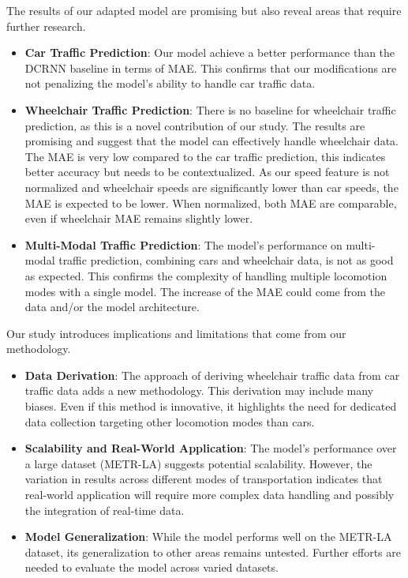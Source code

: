 The results of our adapted model are promising but also reveal areas that require further research.
\begin{itemize}
    \item \textbf{Car Traffic Prediction}:
    Our model achieve a better performance than the DCRNN baseline in terms of MAE\@.
    This confirms that our modifications are not penalizing the model's ability to handle car traffic data.
    \item \textbf{Wheelchair Traffic Prediction}:
    There is no baseline for wheelchair traffic prediction, as this is a novel contribution of our study.
    The results are promising and suggest that the model can effectively handle wheelchair data.
    The MAE is very low compared to the car traffic prediction, this indicates better accuracy but needs to be contextualized.
    As our speed feature is not normalized and wheelchair speeds are significantly lower than car speeds, the MAE is expected to be lower.
    When normalized, both MAE are comparable, even if wheelchair MAE remains slightly lower.
    \item \textbf{Multi-Modal Traffic Prediction}:
    The model's performance on multi-modal traffic prediction, combining cars and wheelchair data, is not as good as expected.
    This confirms the complexity of handling multiple locomotion modes with a single model.
    The increase of the MAE could come from the data and/or the model architecture.
\end{itemize}

Our study introduces implications and limitations that come from our methodology.
\begin{itemize}
    \item \textbf{Data Derivation}:
    The approach of deriving wheelchair traffic data from car traffic data adds a new methodology.
    This derivation may include many biases.
    Even if this method is innovative, it highlights the need for dedicated data collection targeting other locomotion modes than cars.
    \item \textbf{Scalability and Real-World Application}:
    The model's performance over a large dataset (METR-LA) suggests potential scalability.
    However, the variation in results across different modes of transportation indicates that real-world application will require
        more complex data handling and possibly the integration of real-time data.
    \item \textbf{Model Generalization}:
    While the model performs well on the METR-LA dataset, its generalization to other areas remains untested.
    Further efforts are needed to evaluate the model across varied datasets.
\end{itemize}

